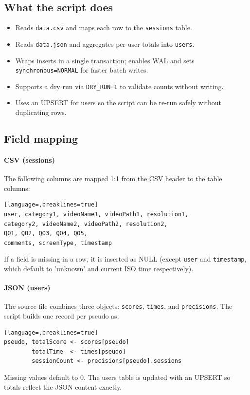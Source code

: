 \documentclass[11pt,a4paper]{article}
\begin{document}
\subsection{What the script does}
\begin{itemize}[noitemsep]
  \item Reads \texttt{data.csv} and maps each row to the \texttt{sessions} table.
  \item Reads \texttt{data.json} and aggregates per-user totals into \texttt{users}.
  \item Wraps inserts in a single transaction; enables WAL and sets \texttt{synchronous=NORMAL} for faster batch writes.
  \item Supports a dry run via \texttt{DRY\_RUN=1} to validate counts without writing.
  \item Uses an UPSERT for users so the script can be re-run safely without duplicating rows.
\end{itemize}

\subsection{Field mapping}
\paragraph{CSV (sessions)} The following columns are mapped 1:1 from the CSV header to the table columns:
\begin{lstlisting}[language=,breaklines=true]
user, category1, videoName1, videoPath1, resolution1,
category2, videoName2, videoPath2, resolution2,
QO1, QO2, QO3, QO4, QO5,
comments, screenType, timestamp
\end{lstlisting}
If a field is missing in a row, it is inserted as NULL (except \texttt{user} and \texttt{timestamp}, which default to 'unknown' and current ISO time respectively).

\paragraph{JSON (users)} The source file combines three objects: \texttt{scores}, \texttt{times}, and \texttt{precisions}. The script builds one record per pseudo as:
\begin{lstlisting}[language=,breaklines=true]
pseudo, totalScore <- scores[pseudo]
        totalTime  <- times[pseudo]
        sessionCount <- precisions[pseudo].sessions
\end{lstlisting}
Missing values default to 0. The users table is updated with an UPSERT so totals reflect the JSON content exactly.
\end{document}
